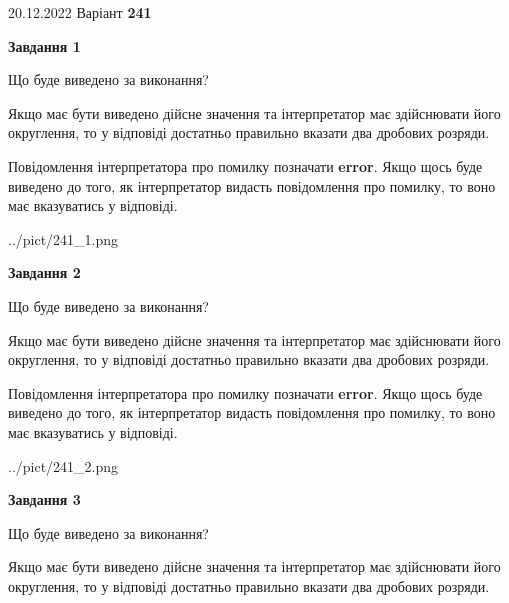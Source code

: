 \documentclass[12pt, ukrainian]{article}
\begin{document}
{20.12.2022 Варіант \No \textbf { 241 }\par}
{
\begin {Large}

{\begin {center}\textbf{Завдання 1}\end {center}}\par
Що буде виведено за виконання? \par

Якщо має бути виведено дійсне значення та інтерпретатор має здійснювати його округлення, 
то у відповіді достатньо правильно вказати два дробових розряди.

Повідомлення інтерпретатора про помилку позначати \textbf{error}.
Якщо щось буде виведено до того, як інтерпретатор видасть повідомлення про помилку, 
то воно має вказуватись у відповіді. \par

\begin{center}
	{../pict/241_1.png}
\end{center}
\newpage

{\begin {center}\textbf{Завдання 2}\end {center}}\par
Що буде виведено за виконання? \par

Якщо має бути виведено дійсне значення та інтерпретатор має здійснювати його округлення, 
то у відповіді достатньо правильно вказати два дробових розряди.

Повідомлення інтерпретатора про помилку позначати \textbf{error}.
Якщо щось буде виведено до того, як інтерпретатор видасть повідомлення про помилку, 
то воно має вказуватись у відповіді. \par

\begin{center}
	{../pict/241_2.png}
\end{center}
\newpage

{\begin {center}\textbf{Завдання 3}\end {center}}\par
Що буде виведено за виконання? \par

Якщо має бути виведено дійсне значення та інтерпретатор має здійснювати його округлення, 
то у відповіді достатньо правильно вказати два дробових розряди.


\end{Large}}
\end{document}

